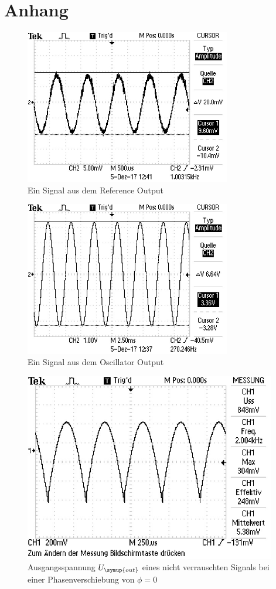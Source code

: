 \newpage
\section{Anhang}
\label{sec:Anhang}

\begin{figure}
  \centering
  \includegraphics[width=9cm]{data/reference_output.jpg}
  \caption{Ein Signal aus dem Reference Output}
  \label{fig:reference_output}
\end{figure}

\begin{figure}
  \centering
  \includegraphics[width=9cm]{data/oscillator_output.jpg}
  \caption{Ein Signal aus dem Oscillator Output}
  \label{fig:oscillator_output}
\end{figure}



\begin{figure}
  \centering
  \includegraphics[width=11cm]{data/phase_0.jpg}
  \caption{Ausgangsspannung $U_{\symup{out}}$ eines nicht verrauschten Signals bei einer Phasenverschiebung
  von $\phi=0$}
  \label{fig:phase_0}
\end{figure}

